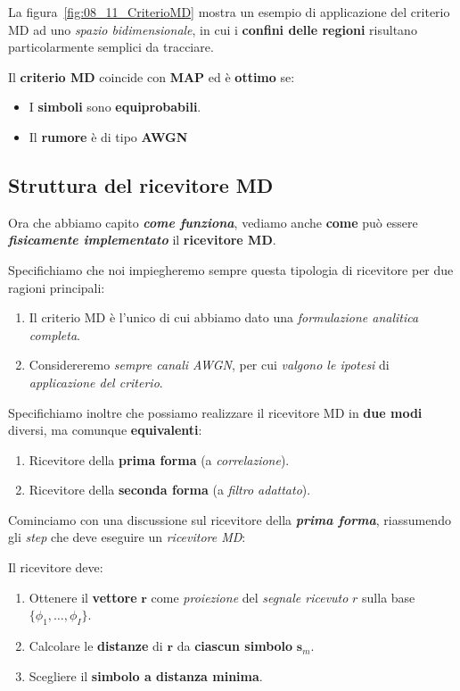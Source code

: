 La figura~\ref{fig:08_11_CriterioMD} mostra un esempio di applicazione del criterio MD
ad uno \textit{spazio bidimensionale}, in cui i \textbf{confini delle regioni} risultano
particolarmente semplici da tracciare.

\begin{remark}[OTTIMALITA']
    Il \textbf{criterio MD} coincide con \textbf{MAP} ed è \textbf{ottimo} se:
    \begin{itemize}
        \item I \textbf{simboli} sono \textbf{equiprobabili}.
        \item Il \textbf{rumore} è di tipo \textbf{AWGN}
    \end{itemize}
\end{remark}

\subsection{Struttura del ricevitore MD}

Ora che abbiamo capito \textbf{\textit{come funziona}}, vediamo anche
\textbf{come} può essere \textbf{\textit{fisicamente implementato}} il \textbf{ricevitore MD}.

Specifichiamo che noi impiegheremo sempre questa tipologia di ricevitore
per due ragioni principali:
\begin{enumerate}
    \item Il criterio MD è l'unico di cui abbiamo dato una \textit{formulazione analitica completa}.
    \item Considereremo \textit{sempre canali AWGN}, per cui \textit{valgono le ipotesi}
        di \textit{applicazione del criterio}.
\end{enumerate}

Specifichiamo inoltre che possiamo realizzare il ricevitore MD in \textbf{due modi} diversi, 
ma comunque \textbf{equivalenti}:
\begin{enumerate}
    \item Ricevitore della \textbf{prima forma} (a \textit{correlazione}).
    \item Ricevitore della \textbf{seconda forma} (a \textit{filtro adattato}).
\end{enumerate}

Cominciamo con una discussione sul ricevitore della \textbf{\textit{prima forma}}, riassumendo
gli \textit{step} che deve eseguire un \textit{ricevitore MD}:

\begin{remark}[RICEVITORE MD]
    Il ricevitore deve:
    \begin{enumerate}
        \item Ottenere il \textbf{vettore} $\mathbf{r}$ come 
            \textit{proiezione} del \textit{segnale ricevuto} $r$ 
            sulla base $\{\phi_{1},\ldots ,\phi_I\}$.
        \item Calcolare le \textbf{distanze} di $\mathbf{r}$ da
            \textbf{ciascun simbolo} $\mathbf{s}_m$.
        \item Scegliere il \textbf{simbolo a distanza minima}.
    \end{enumerate}
\end{remark}

